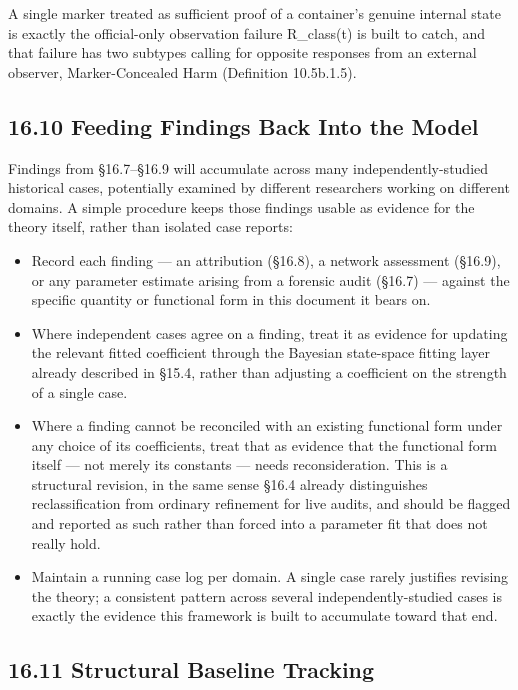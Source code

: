 \documentclass[
]{article}
\begin{document}
A single marker treated as sufficient proof of a container's genuine
internal state is exactly the official-only observation failure
R\_class(t) is built to catch, and that failure has two subtypes calling
for opposite responses from an external observer, Marker-Concealed Harm
(Definition 10.5b.1.5).

\hypertarget{feeding-findings-back-into-the-model}{%
\subsection{16.10 Feeding Findings Back Into the
Model}\label{feeding-findings-back-into-the-model}}

Findings from §16.7--§16.9 will accumulate across many
independently-studied historical cases, potentially examined by
different researchers working on different domains. A simple procedure
keeps those findings usable as evidence for the theory itself, rather
than isolated case reports:

\begin{itemize}
\item
  Record each finding --- an attribution (§16.8), a network assessment
  (§16.9), or any parameter estimate arising from a forensic audit
  (§16.7) --- against the specific quantity or functional form in this
  document it bears on.
\item
  Where independent cases agree on a finding, treat it as evidence for
  updating the relevant fitted coefficient through the Bayesian
  state-space fitting layer already described in §15.4, rather than
  adjusting a coefficient on the strength of a single case.
\item
  Where a finding cannot be reconciled with an existing functional form
  under any choice of its coefficients, treat that as evidence that the
  functional form itself --- not merely its constants --- needs
  reconsideration. This is a structural revision, in the same sense
  §16.4 already distinguishes reclassification from ordinary refinement
  for live audits, and should be flagged and reported as such rather
  than forced into a parameter fit that does not really hold.
\item
  Maintain a running case log per domain. A single case rarely justifies
  revising the theory; a consistent pattern across several
  independently-studied cases is exactly the evidence this framework is
  built to accumulate toward that end.
\end{itemize}

\hypertarget{structural-baseline-tracking}{%
\subsection{16.11 Structural Baseline
Tracking}\label{structural-baseline-tracking}}
\end{document}
